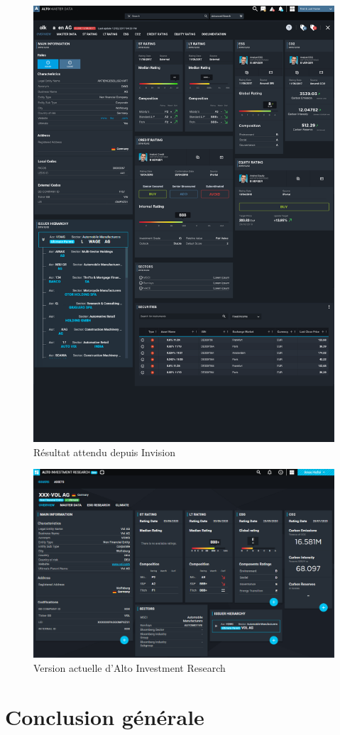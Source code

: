 \begin{figure}[ht]
    \centering
    \includegraphics[width=\columnwidth]{img/invisionEx.png}
    \caption{Résultat attendu depuis Invision}
    \label{fig:altoInv}
\end{figure}
\begin{figure}[ht]
    \centering
    \includegraphics[width=\columnwidth]{img/investmentRsch.png}
    \caption{Version actuelle d'Alto Investment Research}
    \label{fig:altoCurent}
\end{figure}
\chapter{Conclusion générale}
